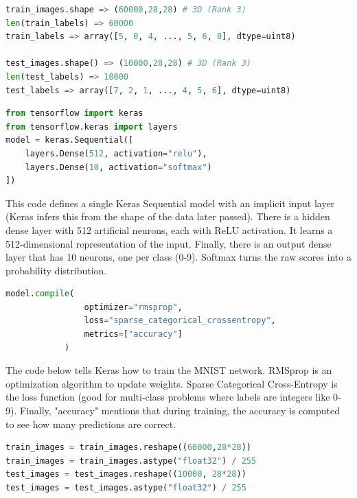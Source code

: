 {\begin{lstlisting}[language=python, breaklines=true]
train_images.shape => (60000,28,28) # 3D (Rank 3)
len(train_labels) => 60000
train_labels => array([5, 0, 4, ..., 5, 6, 8], dtype=uint8)

test_images.shape() => (10000,28,28) # 3D (Rank 3)
len(test_labels) => 10000
test_labels => array([7, 2, 1, ..., 4, 5, 6], dtype=uint8)
\end{lstlisting}
\vs


\vs
\begin{lstlisting}[language=python, breaklines=true]
from tensorflow import keras
from tensorflow.keras import layers
model = keras.Sequential([
    layers.Dense(512, activation="relu"),
    layers.Dense(10, activation="softmax")
])
\end{lstlisting}
\vs

This code defines a single Keras Sequential model with an implicit input layer (Keras infers this from the shape of the data later passed). There is a hidden dense layer with 512 artificial neurons, each with ReLU activation. It learns a 512-dimensional representation of the input. Finally, there is an output dense layer that has 10 neurons, one per class (0-9). Softmax turns the raw scores into a probability distribution.


\vs
\begin{lstlisting}[language=python, breaklines=true]
model.compile(
                optimizer="rmsprop",
                loss="sparse_categorical_crossentropy",
                metrics=["accuracy"]
            )
\end{lstlisting}
\vs

The code below tells Keras how to train the MNIST network. RMSprop is an optimization algorithm to update weights. Sparse Categorical Cross-Entropy is the loss function (good for multi-class problems where labels are integers like 0-9). Finally, "accuracy" mentions that during training, the accuracy is computed to see how many predictions are correct.


\begin{lstlisting}[language=python, breaklines=true]
train_images = train_images.reshape((60000,28*28))
train_images = train_images.astype("float32") / 255
test_images = test_images.reshape((10000, 28*28))
test_images = test_images.astype("float32") / 255
\end{lstlisting}
\vs

}
